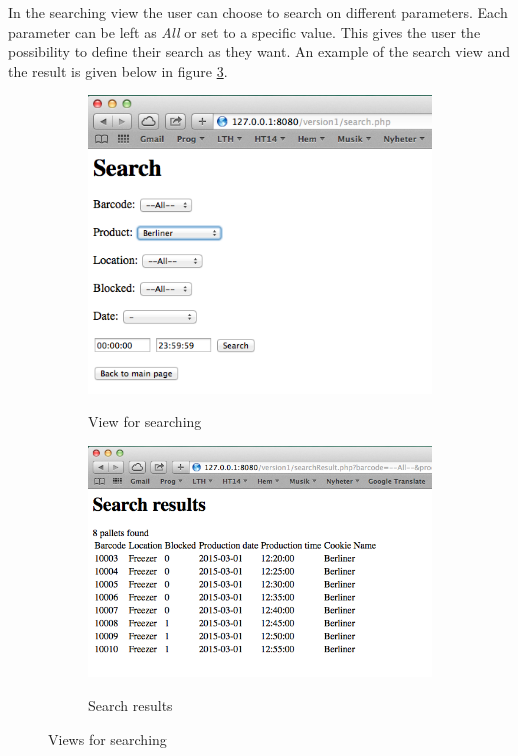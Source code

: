 \documentclass[a4paper]{scrartcl}
\numberwithin{equation}{section}
\begin{document}
In the searching view the user can choose to search on different parameters. Each parameter can be left as \emph{All} or set to a specific value. This gives the user the possibility to define their search as they want. An example of the search view and the result is given below in figure \ref{figure:viewSR}.

\newpage

\begin{figure}[h!]
  \centering
  	\begin{subfigure}[b]{0.45\textwidth}
    	\includegraphics[width=\textwidth]{figures/view_search.png}
    	\label{figure:view_search}
    	\caption{View for searching}
 		\end{subfigure}	
 		\begin{subfigure}[b]{0.45\textwidth}
    	\includegraphics[width=\textwidth]{figures/view_searchResult.png}
    	\label{figure:view_searchResult}
    	\caption{Search results}
 		\end{subfigure} 
 		\caption{Views for searching}
    \label{figure:viewSR}
\end{figure}
\end{document}
